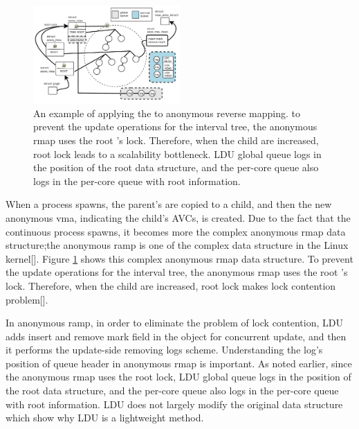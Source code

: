 \begin{figure}[tb]
  \begin{center}
     \includegraphics[width=0.5\textwidth,height=0.5\textheight,keepaspectratio]{fig/anon_vma}
  \end{center}
  \caption{An example of applying the  to anonymous reverse mapping. to
  prevent the update operations for the interval tree, the anonymous rmap uses
  the root 's lock. Therefore, when the child 
  are increased, root lock leads to a scalability bottleneck. LDU global queue
  logs in the position of the root data structure, and the per-core queue also
  logs in the per-core queue with root information.}
  \label{fig:anonvmaramp}
\end{figure}

When a process spawns, the parent's  are copied
to a child, and then the new anonymous vma, indicating the child's AVCs, is
created.
Due to the fact that the continuous process spawns, it becomes more the complex
anonymous rmap data structure;the anonymous ramp is one of the complex data
structure in the Linux kernel[].
Figure \ref{fig:anonvmaramp} shows this complex anonymous rmap data
structure.
To prevent the update operations for the interval tree, the anonymous rmap
uses the root 's lock. 
Therefore, when the child  are increased, root lock makes lock
contention problem[].

In anonymous ramp, in order to eliminate the problem of lock contention, LDU
adds insert and remove mark field in the  object for concurrent
update, and then it performs the update-side removing logs scheme.
Understanding the log's position of queue header in anonymous rmap is important.
As noted earlier, since the anonymous rmap uses the root lock, LDU global
queue logs in the position of the root data structure, and the per-core queue
also logs in the per-core queue with root information.
LDU does not largely modify the original data structure which show why LDU is a
lightweight method.

